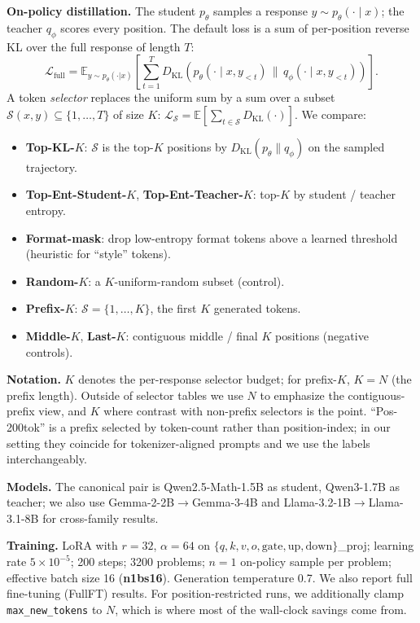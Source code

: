 \documentclass[10pt]{article}
\begin{document}
\textbf{On-policy distillation.} The student $p_\theta$ samples a response $y \sim p_\theta(\cdot \mid x)$; the teacher $q_\phi$ scores every position. The default loss is a sum of per-position reverse KL over the full response of length $T$:
\begin{equation}
\mathcal{L}_{\text{full}}
= \mathbb{E}_{y \sim p_\theta(\cdot|x)} \left[\sum_{t=1}^{T} D_{\mathrm{KL}}\!\left(p_\theta(\cdot \mid x, y_{<t}) \,\|\, q_\phi(\cdot \mid x, y_{<t})\right)\right].
\label{eq:fullseq}
\end{equation}
A token \emph{selector} replaces the uniform sum by a sum over a subset $\mathcal{S}(x,y) \subseteq \{1,\dots,T\}$ of size $K$: $\mathcal{L}_\mathcal{S} = \mathbb{E}\left[\sum_{t \in \mathcal{S}} D_{\mathrm{KL}}(\cdot)\right]$. We compare:
\begin{itemize}
\item \textbf{Top-KL-$K$}: $\mathcal{S}$ is the top-$K$ positions by $D_{\mathrm{KL}}(p_\theta\|q_\phi)$ on the sampled trajectory.
\item \textbf{Top-Ent-Student-$K$}, \textbf{Top-Ent-Teacher-$K$}: top-$K$ by student / teacher entropy.
\item \textbf{Format-mask}: drop low-entropy format tokens above a learned threshold (heuristic for ``style'' tokens).
\item \textbf{Random-$K$}: a $K$-uniform-random subset (control).
\item \textbf{Prefix-$K$}: $\mathcal{S} = \{1,\dots,K\}$, the first $K$ generated tokens.
\item \textbf{Middle-$K$}, \textbf{Last-$K$}: contiguous middle / final $K$ positions (negative controls).
\end{itemize}

\textbf{Notation.} $K$ denotes the per-response selector budget; for prefix-$K$, $K=N$ (the prefix length). Outside of selector tables we use $N$ to emphasize the contiguous-prefix view, and $K$ where contrast with non-prefix selectors is the point. ``Pos-200tok'' is a prefix selected by token-count rather than position-index; in our setting they coincide for tokenizer-aligned prompts and we use the labels interchangeably.

\textbf{Models.} The canonical pair is Qwen2.5-Math-1.5B \citep{qwen2024qwen25math} as student, Qwen3-1.7B \citep{qwen2025qwen3} as teacher; we also use Gemma-2-2B$\to$Gemma-3-4B and Llama-3.2-1B$\to$Llama-3.1-8B for cross-family results.

\textbf{Training.} LoRA \citep{hu2022lora} with $r=32$, $\alpha=64$ on $\{q,k,v,o,\text{gate},\text{up},\text{down}\}$\_proj; learning rate $5\times 10^{-5}$; 200 steps; 3200 problems; $n=1$ on-policy sample per problem; effective batch size 16 (\textbf{n1bs16}). Generation temperature 0.7. We also report full fine-tuning (FullFT) results. For position-restricted runs, we additionally clamp \texttt{max\_new\_tokens} to $N$, which is where most of the wall-clock savings come from.
\end{document}
